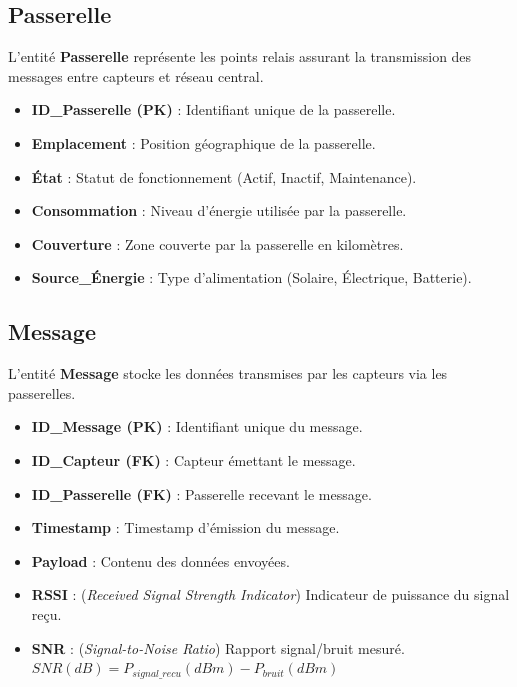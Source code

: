 \documentclass[
	a4paper, %
	11pt, %
	unnumberedsections, %
	twoside, %
    xcolor = {dvipsnames}
]{class}
\begin{document}
\subsection{Passerelle}
L’entité \textbf{Passerelle} représente les points relais assurant la transmission des messages entre capteurs et réseau central.
\begin{itemize}
    \item \textbf{ID\_Passerelle (PK)} : Identifiant unique de la passerelle.
    \item \textbf{Emplacement} : Position géographique de la passerelle.
    \item \textbf{État} : Statut de fonctionnement (Actif, Inactif, Maintenance).
    \item \textbf{Consommation} : Niveau d’énergie utilisée par la passerelle.
    \item \textbf{Couverture} : Zone couverte par la passerelle en kilomètres.
    \item \textbf{Source\_\'Energie} : Type d'alimentation (Solaire, Électrique, Batterie).
\end{itemize}

\subsection{Message}
L’entité \textbf{Message} stocke les données transmises par les capteurs via les passerelles.
\begin{itemize}
    \item \textbf{ID\_Message (PK)} : Identifiant unique du message.
    \item \textbf{ID\_Capteur (FK)} : Capteur émettant le message.
    \item \textbf{ID\_Passerelle (FK)} : Passerelle recevant le message.
    \item \textbf{Timestamp} : Timestamp d'\'emission du message.
    \item \textbf{Payload} : Contenu des données envoyées.
    \item \textbf{RSSI} : (\textit{Received Signal Strength Indicator}) Indicateur de puissance du signal reçu.
    \item \textbf{SNR} : (\textit{Signal-to-Noise Ratio}) Rapport signal/bruit mesuré.\\\(SNR(dB)=P_{signal\_recu}(dBm)-P_{bruit}(dBm)\)
\end{itemize}
\end{document}
